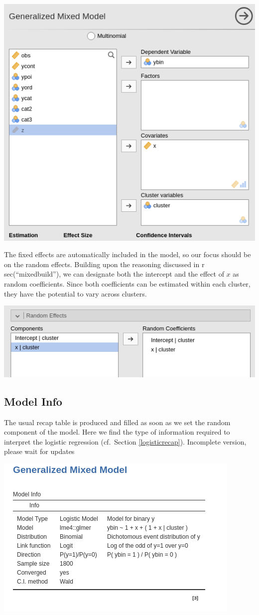 \documentclass[
]{book}
\begin{document}
\includegraphics[width=0.8\linewidth]{bookletpics/5_logistic_input2}

The fixed effects are automatically included in the model, so our focus should be on the random effects. Building upon the reasoning discussed in r sec(``mixedbuild''), we can designate both the intercept and the effect of \(x\) as random coefficients. Since both coefficients can be estimated within each cluster, they have the potential to vary across clusters.

\includegraphics[width=0.8\linewidth]{bookletpics/5_logistic_input3}

\hypertarget{model-info-1}{%
\subsection{Model Info}\label{model-info-1}}

The usual recap table is produced and filled as soon as we set the random component of the model. Here we find the type of information required to interpret the logistic regression (cf.~Section \ref{logisticrecap}).
{ Incomplete version, please wait for updates }

\includegraphics[width=0.8\linewidth]{bookletpics/5_logistic_output1}
\end{document}

